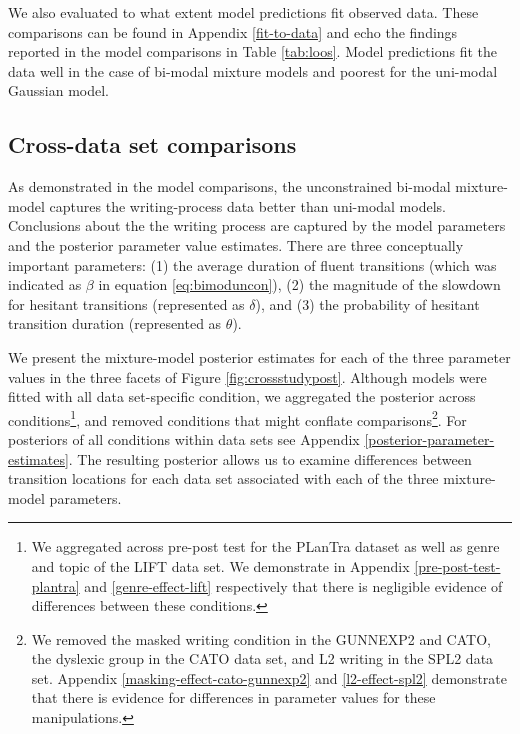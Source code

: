 \documentclass[
  english,
  man,floatsintext]{apa7}
\begin{document}
We also evaluated to what extent model predictions fit observed data. These comparisons can be found in Appendix \ref{fit-to-data} and echo the findings reported in the model comparisons in Table \ref{tab:loos}. Model predictions fit the data well in the case of bi-modal mixture models and poorest for the uni-modal Gaussian model.

\hypertarget{cross-data-set-comparisons}{%
\subsection{Cross-data set comparisons}\label{cross-data-set-comparisons}}

As demonstrated in the model comparisons, the unconstrained bi-modal mixture-model captures the writing-process data better than uni-modal models. Conclusions about the the writing process are captured by the model parameters and the posterior parameter value estimates. There are three conceptually important parameters: (1) the average duration of fluent transitions (which was indicated as \(\beta\) in equation \ref{eq:bimoduncon}), (2) the magnitude of the slowdown for hesitant transitions (represented as \(\delta\)), and (3) the probability of hesitant transition duration (represented as \(\theta\)).

We present the mixture-model posterior estimates for each of the three parameter values in the three facets of Figure \ref{fig:crossstudypost}. Although models were fitted with all data set-specific condition, we aggregated the posterior across conditions\footnote{We aggregated across pre-post test for the PLanTra dataset as well as genre and topic of the LIFT data set. We demonstrate in Appendix \ref{pre-post-test-plantra} and \ref{genre-effect-lift} respectively that there is negligible evidence of differences between these conditions.}, and removed conditions that might conflate comparisons\footnote{We removed the masked writing condition in the GUNNEXP2 and CATO, the dyslexic group in the CATO data set, and L2 writing in the SPL2 data set. Appendix \ref{masking-effect-cato-gunnexp2} and \ref{l2-effect-spl2} demonstrate that there is evidence for differences in parameter values for these manipulations.}. For posteriors of all conditions within data sets see Appendix \ref{posterior-parameter-estimates}. The resulting posterior allows us to examine differences between transition locations for each data set associated with each of the three mixture-model parameters.
\end{document}
